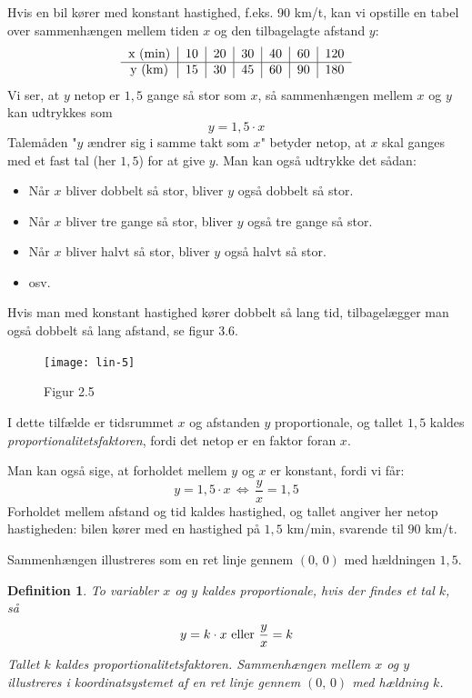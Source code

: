 \documentclass[12pt,oneside,a4paper]{article}
\newtheorem{mydef}[thm]{Definition}
\begin{document}
Hvis en bil kører med konstant hastighed, f.eks. 90 km/t, kan vi opstille en
tabel over sammenhængen mellem tiden $x$ og den tilbagelagte afstand $y$:
\[
\begin{tabular}{c|c|c|c|c|c|c}
    x ({\rm min}) & 10 & 20 & 30 & 40 & 60 & 120 \\
    \hline
    y ({\rm km})  & 15 & 30 & 45 & 60 & 90 & 180  
\end{tabular}
\]
Vi ser, at $y$ netop er $1,5$ gange så stor som $x$, så sammenhængen mellem $x$
og $y$ kan udtrykkes som
\[
y = 1,5\cdot x
\]
Talemåden "$y$ ændrer sig i samme takt som $x$" betyder netop, at $x$ skal
ganges med et fast tal (her $1,5$) for at give $y$. Man kan også udtrykke det
sådan:
\begin{itemize}
    \item Når $x$ bliver dobbelt så stor, bliver $y$ også dobbelt så stor.
    \item Når $x$ bliver tre gange så stor, bliver $y$ også tre gange så stor.
    \item Når $x$ bliver halvt så stor, bliver $y$ også halvt så stor.
    \item osv.
\end{itemize}
Hvis man med konstant hastighed kører dobbelt så lang tid, tilbagelægger man
også dobbelt så lang afstand, se figur 3.6.

\begin{figure}[H]
    \centering
    \texttt{[image: lin-5]}
    \caption{Figur 2.5}
    \label{fig36}
\end{figure}

I dette tilfælde er tidsrummet $x$ og afstanden $y$ proportionale, og tallet
$1,5$ kaldes {\em proportionalitetsfaktoren}, fordi det netop er en faktor foran $x$.

Man kan også sige, at forholdet mellem $y$ og $x$ er konstant, fordi vi får:
\[
y = 1,5\cdot x \, \Leftrightarrow \, \frac{y}{x} = 1,5
\]
Forholdet mellem afstand og tid kaldes hastighed, og tallet angiver her netop
hastigheden: bilen kører med en hastighed på $1,5$ km/min, svarende til $90$
km/t.

Sammenhængen illustreres som en ret linje gennem $(0,\,0)$ med hældningen $1,5$.

\begin{mydef}
    To variabler $x$ og $y$ kaldes proportionale, hvis der findes et tal $k$, så
    $$
    y = k\cdot x \,\, {\rm eller} \,\, \frac{y}{x} = k
    $$
    Tallet $k$ kaldes proportionalitetsfaktoren. Sammenhængen mellem $x$ og $y$
    illustreres i koordinatsystemet af en ret linje gennem $(0,\,0)$ med 
    hældning $k$.
\end{mydef}
\end{document}
